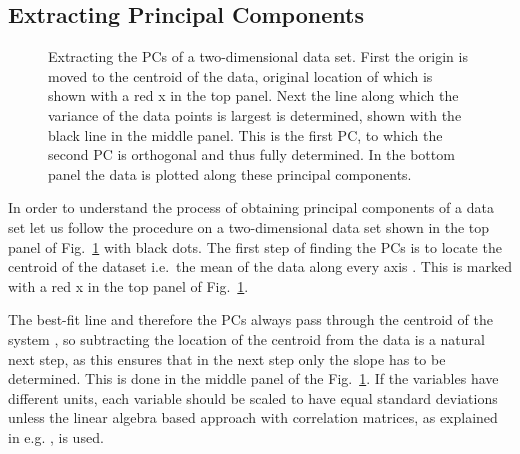 \documentclass[english, twoside]{HYgradu}
\begin{document}
\subsection{Extracting Principal Components}
\begin{figure}
    \centering
    
    \caption{Extracting the PCs of a two-dimensional data set. First the origin is moved to the centroid of the data, original location of which is shown with a red x in the top panel. Next the line along which the variance of the data points is largest is determined, shown with the black line in the middle panel. This is the first PC, to which the second PC is orthogonal and thus fully determined. In the bottom panel the data is plotted along these principal components.
    }\label{fig:pca-illustrated}
\end{figure}

In order to understand the process of obtaining principal components of a data set let us follow the procedure on a two-dimensional data set shown in the top panel of Fig.\ \ref{fig:pca-illustrated} with black dots. The first step of finding the PCs is to locate the centroid of the dataset i.e.\ the mean of the data along every axis \citep{smith2002tutorial}. This is marked with a red x in the top panel of Fig.\ \ref{fig:pca-illustrated}.

The best-fit line and therefore the PCs always pass through the centroid of the system \citep{pearson1901lines}, so subtracting the location of the centroid from the data is a natural next step, as this ensures that in the next step only the slope has to be determined. This is done in the middle panel of the Fig.\ \ref{fig:pca-illustrated}. If the variables have different units, each variable should be scaled to have equal standard deviations \citep{james2013introduction} unless the linear algebra based approach with correlation matrices, as explained in e.g. \citet{jolliffe2002principal}, is used.
\end{document}
